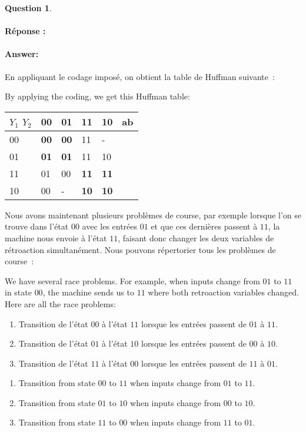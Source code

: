 \documentclass[11pt,a4paper,dvipsnames]{article}
\theoremstyle{definition}%
\newtheorem{Q}{Question}[] %
\newcommand{\reponse}[1]{%
	\ifthenelse {\boolean{corrige}} {\fr{\paragraph{Réponse :}}\en{\paragraph{Answer:}} \color{darkblue}   #1\color{black}} {}
 }
\newcommand{\fr}[1]{
 	\ifthenelse {\boolean{fr}} {#1} {}
 }
\newcommand{\en}[1]{
 	\ifthenelse {\boolean{en}} {#1} {}
 }
\begin{document}
\begin{Q}
\begin{enumerate}
		\reponse{
			\fr{En appliquant le codage imposé, on obtient la table de Huffman suivante~:}
			\en{By applying the coding, we get this Huffman table:}
			\begin{center}
				\begin{tabular}{|l|l|l|l|l|l}
				\hline
				 $Y_1$ $Y_2$ & 00         & 01         & 11         & 10         & \multicolumn{1}{l|}{ab} \\ \hline
				00 & \textbf{00} & \textbf{00} & 11          & -          &    \\ \cline{1-5}
				01 & \textbf{01} & \textbf{01} & 11          & 10          &    \\ \cline{1-5}
				11 & 01          & 00          & \textbf{11} & \textbf{11} &    \\ \cline{1-5}
				10 & 00          & -          & \textbf{10} & \textbf{10} &    \\ \cline{1-5}
				\end{tabular}
			\end{center}

			\fr{Nous avons maintenant plusieurs problèmes de course, par exemple lorsque l'on se trouve dans l'état $00$ avec les entrées $01$ et que ces dernières passent à $11$, la machine nous envoie à l'état $11$, faisant donc changer les deux variables de rétroaction simultanément.
			Nous pouvons répertorier tous les problèmes de course~:}
			\en{We have several race problems.
			For example, when inputs change from $01$ to $11$ in state $00$, the machine sends us to $11$ where both retroaction variables changed.
			Here are all the race problems:}
			\fr{%
			\begin{enumerate}
				\item Transition de l'état $00$ à l'état $11$ lorsque les entrées passent de $01$ à $11$.
				\item Transition de l'état $01$ à l'état $10$ lorsque les entrées passent de $00$ à $10$.
				\item Transition de l'état $11$ à l'état $00$ lorsque les entrées passent de $11$ à $01$.
			\end{enumerate}
			}
			\en{%
			\begin{enumerate}
				\item Transition from state $00$ to $11$ when inputs change from $01$ to $11$.
				\item Transition from state $01$ to $10$ when inputs change from $00$ to $10$.
				\item Transition from state $11$ to $00$ when inputs change from $11$ to $01$.
			\end{enumerate}
			}

}
\end{enumerate}
\end{Q}
\end{document}
